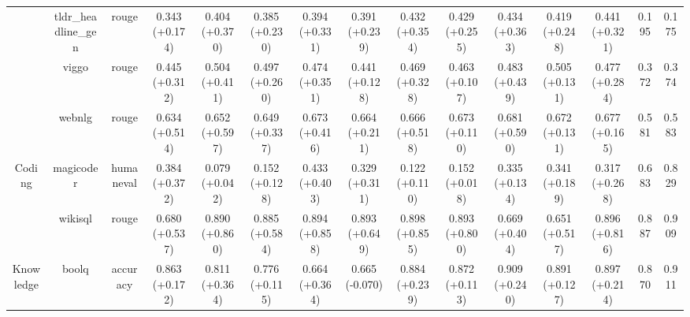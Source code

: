 \begin{landscape}
\begin{table}[ht]
{\begin{tabular}{ccccccccccccccc}
                                   & tldr\_headline\_gen            & rouge                            & 0.343 (+0.174)     & 0.404 (+0.370)    & 0.385 (+0.230)             & 0.394 (+0.331)    & 0.391 (+0.239)             & 0.432 (+0.354)      & 0.429 (+0.255)           & 0.434 (+0.363)      & 0.419 (+0.248)               & 0.441 (+0.321)          & 0.195                  & 0.175          \\
                                   & viggo                          & rouge                            & 0.445 (+0.312)     & 0.504 (+0.411)    & 0.497 (+0.260)             & 0.474 (+0.351)    & 0.441 (+0.128)             & 0.469 (+0.328)      & 0.463 (+0.107)           & 0.483 (+0.439)      & 0.505 (+0.131)               & 0.477 (+0.284)          & 0.372                  & 0.374          \\
                                   & webnlg                         & rouge                            & 0.634 (+0.514)     & 0.652 (+0.597)    & 0.649 (+0.337)             & 0.673 (+0.416)    & 0.664 (+0.211)             & 0.666 (+0.518)      & 0.673 (+0.110)           & 0.681 (+0.590)      & 0.672 (+0.131)               & 0.677 (+0.165)          & 0.581                  & 0.583          \\
\midrule
\multirow{2}{*}{Coding}            & magicoder                      & humaneval                        & 0.384 (+0.372)     & 0.079 (+0.042)    & 0.152 (+0.128)             & 0.433 (+0.403)    & 0.329 (+0.311)             & 0.122 (+0.110)      & 0.152 (+0.018)           & 0.335 (+0.134)      & 0.341 (+0.189)               & 0.317 (+0.268)          & 0.683                  & 0.829          \\
                                   & wikisql                        & rouge                            & 0.680 (+0.537)     & 0.890 (+0.860)    & 0.885 (+0.584)             & 0.894 (+0.858)    & 0.893 (+0.649)             & 0.898 (+0.855)      & 0.893 (+0.800)           & 0.669 (+0.404)      & 0.651 (+0.517)               & 0.896 (+0.816)          & 0.887                  & 0.909          \\
\midrule
\multirow{8}{*}{Knowledge}         & boolq                          & accuracy                         & 0.863 (+0.172)     & 0.811 (+0.364)    & 0.776 (+0.115)             & 0.664 (+0.364)    & 0.665 (-0.070)             & 0.884 (+0.239)      & 0.872 (+0.113)           & 0.909 (+0.240)      & 0.891 (+0.127)               & 0.897 (+0.214)          & 0.870                  & 0.911          \\

\end{tabular}}
\end{table}
\end{landscape}
